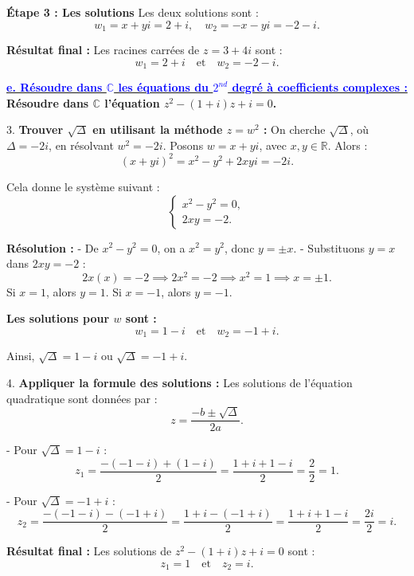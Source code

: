 \documentclass[12pt]{article}
\begin{document}
\textbf{Étape 3 : Les solutions}  
Les deux solutions sont :
\[
w_1 = x + yi = 2 + i, \quad w_2 = -x - yi = -2 - i.
\]

\textbf{Résultat final :}  
Les racines carrées de \( z = 3 + 4i \) sont :
\[
w_1 = 2 + i \quad \text{et} \quad w_2 = -2 - i.
\]

\underline{\textbf{\textcolor{blue}{e. Résoudre dans $\mathbb{C}$ les équations du $2^{nd}$ degré à coefficients complexes :}}}\\
\textbf{Résoudre dans \( \mathbb{C} \) l’équation \( z^2 - (1 + i)z + i = 0 \).}

3. \textbf{Trouver \( \sqrt{\Delta} \) en utilisant la méthode \( z = w^2 \) :}  
On cherche \( \sqrt{\Delta} \), où \( \Delta = -2i \), en résolvant \( w^2 = -2i \).  
Posons \( w = x + yi \), avec \( x, y \in \mathbb{R} \). Alors :
\[
(x + yi)^2 = x^2 - y^2 + 2xyi = -2i.
\]

Cela donne le système suivant :
\[
\begin{cases}
x^2 - y^2 = 0, \\
2xy = -2.
\end{cases}
\]

\textbf{Résolution :}
- De \( x^2 - y^2 = 0 \), on a \( x^2 = y^2 \), donc \( y = \pm x \).
- Substituons \( y = x \) dans \( 2xy = -2 \) :
  \[
  2x(x) = -2 \implies 2x^2 = -2 \implies x^2 = 1 \implies x = \pm 1.
  \]
  Si \( x = 1 \), alors \( y = 1 \).  
  Si \( x = -1 \), alors \( y = -1 \).

\textbf{Les solutions pour \( w \) sont :}
\[
w_1 = 1 - i \quad \text{et} \quad w_2 = -1 + i.
\]

Ainsi, \( \sqrt{\Delta} = 1 - i \) ou \( \sqrt{\Delta} = -1 + i \).

4. \textbf{Appliquer la formule des solutions :}  
Les solutions de l’équation quadratique sont données par :
\[
z = \frac{-b \pm \sqrt{\Delta}}{2a}.
\]

- Pour \( \sqrt{\Delta} = 1 - i \) :
  \[
  z_1 = \frac{-(-1 - i) + (1 - i)}{2} = \frac{1 + i + 1 - i}{2} = \frac{2}{2} = 1.
  \]

- Pour \( \sqrt{\Delta} = -1 + i \) :
  \[
  z_2 = \frac{-(-1 - i) - (-1 + i)}{2} = \frac{1 + i - (-1 + i)}{2} = \frac{1 + i + 1 - i}{2} = \frac{2i}{2} = i.
  \]

\textbf{Résultat final :}  
Les solutions de \( z^2 - (1 + i)z + i = 0 \) sont :
\[
z_1 = 1 \quad \text{et} \quad z_2 = i.
\]
\end{document}
